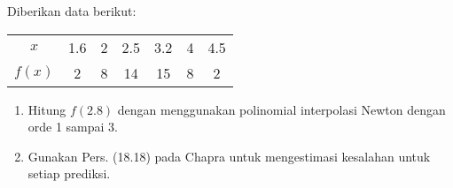 \begin{soal}

Diberikan data berikut:

{\centering
\begin{tabular}{|c|cccccc|}
\hline
$x$    & 1.6 & 2 & 2.5 & 3.2 & 4 & 4.5 \\
$f(x)$ & 2   & 8 & 14  & 15  & 8 & 2 \\
\hline
\end{tabular}
\par}

\begin{enumerate}[label=(\alph*)]
\item Hitung $f(2.8)$ dengan menggunakan polinomial interpolasi Newton dengan orde 1 sampai 3.
\item Gunakan Pers. (18.18) pada Chapra untuk mengestimasi kesalahan untuk setiap prediksi.
\end{enumerate}
\end{soal}